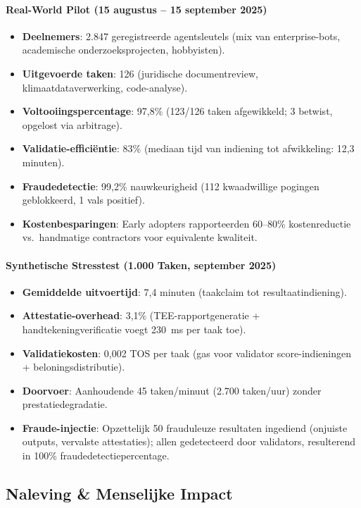 \documentclass[11pt]{article}
\begin{document}
\paragraph{Real-World Pilot (15 augustus -- 15 september 2025)}
\begin{itemize}[noitemsep]
  \item \textbf{Deelnemers}: 2.847 geregistreerde agentsleutels (mix van enterprise-bots, academische onderzoeksprojecten, hobbyisten).
  \item \textbf{Uitgevoerde taken}: 126 (juridische documentreview, klimaatdataverwerking, code-analyse).
  \item \textbf{Voltooiingspercentage}: 97,8\% (123/126 taken afgewikkeld; 3 betwist, opgelost via arbitrage).
  \item \textbf{Validatie-efficiëntie}: 83\% (mediaan tijd van indiening tot afwikkeling: 12,3 minuten).
  \item \textbf{Fraudedetectie}: 99,2\% nauwkeurigheid (112 kwaadwillige pogingen geblokkeerd, 1 vals positief).
  \item \textbf{Kostenbesparingen}: Early adopters rapporteerden 60--80\% kostenreductie vs.\ handmatige contractors voor equivalente kwaliteit.
\end{itemize}

\paragraph{Synthetische Stresstest (1.000 Taken, september 2025)}
\begin{itemize}[noitemsep]
  \item \textbf{Gemiddelde uitvoertijd}: 7,4 minuten (taakclaim tot resultaatindiening).
  \item \textbf{Attestatie-overhead}: 3,1\% (TEE-rapportgeneratie + handtekeningverificatie voegt 230~ms per taak toe).
  \item \textbf{Validatiekosten}: 0,002 TOS per taak (gas voor validator score-indieningen + beloningsdistributie).
  \item \textbf{Doorvoer}: Aanhoudende 45 taken/minuut (2.700 taken/uur) zonder prestatiedegradatie.
  \item \textbf{Fraude-injectie}: Opzettelijk 50 frauduleuze resultaten ingediend (onjuiste outputs, vervalste attestaties); allen gedetecteerd door validators, resulterend in 100\% fraudedetectiepercentage.
\end{itemize}

\subsection{Naleving \& Menselijke Impact}
\end{document}
